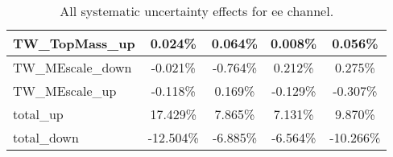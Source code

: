 \begin{table}[]
{\begin{tabular}{|l|c|c|c|c|}
TW\_TopMass\_up                & 0.024\%                       & 0.064\%                    & 0.008\%                      & 0.056\%                 \\ \hline
TW\_MEscale\_down             & -0.021\%                    & -0.764\%                 & 0.212\%                   & 0.275\%              \\ \hline
TW\_MEscale\_up               & -0.118\%                      & 0.169\%                   & -0.129\%                     & -0.307\%                \\ \hline
total\_up                          & 17.429\%                           & 7.865\%                           & 7.131\%                          & 9.870\%                           \\ \hline
total\_down                        & -12.504\%                         & -6.885\%                         & -6.564\%                        & -10.266\%                         \\ \hline \hline
\end{tabular}}
\caption{All systematic uncertainty effects for ee channel.}
\label{tab:ee_all}
\end{table}
